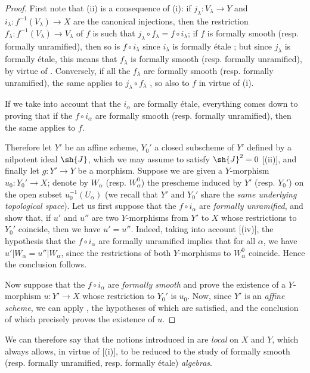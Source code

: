 \begin{proof}
First note that (ii) is a consequence of (i): if $j_\lambda:V_\lambda\to Y$ and $i_\lambda:f^{-1}(V_\lambda)\to X$ are the canonical injections, then the restriction $f_\lambda:f^{-1}(V_\lambda)\to V_\lambda$ of $f$ is such that $j_\lambda\circ f_\lambda=f\circ i_\lambda$;
if $f$ is formally smooth (resp. formally unramified), then so is $f\circ i_\lambda$ since $i_\lambda$ is formally \'etale ;
but since $j_\lambda$ is formally \'etale, this means that $f_\lambda$ is formally smooth (resp. formally unramified), by virtue of .
Conversely, if all the $f_\lambda$ are formally smooth (resp. formally unramified), the same applies to $j_\lambda\circ f_\lambda$ , so also to $f$ in virtue of (i).

If we take into account that the $i_\alpha$ are formally \'etale, everything comes down to proving that if the $f\circ i_\alpha$ are formally smooth (resp. formally unramified), then the same applies to $f$.

Therefore let $Y'$ be an affine scheme, $Y_0'$ a closed subscheme of $Y'$ defined by a nilpotent ideal $\sh{J}$, which we may assume to satisfy $\sh{J}^2=0$ [(ii)], and finally let $g:Y'\to Y$ be a morphism. 
Suppose we are given a $Y$-morphism $u_0:Y_0'\to X$;
denote by $W_\alpha$ (resp. $W_\alpha^0$) the prescheme induced by $Y'$ (resp. $Y_0'$) on the open subset $u_0^{-1}(U_\alpha)$ (we recall that $Y'$ and $Y_0'$ share the \emph{same underlying topological space}). 
Let us first suppose that the $f\circ i_\alpha$ are \emph{formally unramified}, and show that, if $u'$ and $u''$ are two $Y$-morphisms from $Y'$ to $X$ whose restrictions to $Y_0'$ coincide, then we have $u'=u''$. 
Indeed, taking into account [(iv)], the hypothesis that the $f\circ i_\alpha$ are formally unramified implies that for all $\alpha$, we have $u'|W_\alpha=u''|W_\alpha$, since the restrictions of both $Y$-morphisms to $W_\alpha^0$ coincide. 
Hence the conclusion follows.

Now suppose that the $f\circ i_\alpha$ are \emph{formally smooth} and prove the existence of a $Y$-morphism $u:Y'\to X$ whose restriction to $Y_0'$ is $u_0$.
Now, since $Y'$ is an \emph{affine scheme}, we can apply , the hypotheses of which are satisfied, and the conclusion of which precisely proves the existence of $u$.
\end{proof}

We can therefore say that the notions introduced in  are \emph{local} on $X$ and $Y$, which always allows, in virtue of [(i)], to be reduced to the study of formally smooth (resp. formally unramified, resp. formally \'etale) \emph{algebras}.

